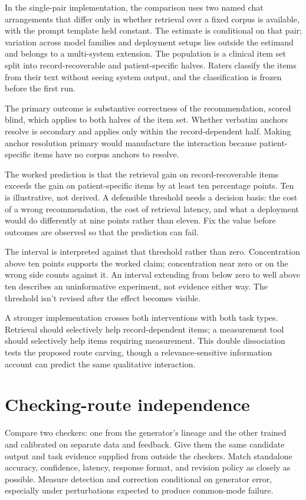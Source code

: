 \documentclass[12pt]{article}
\begin{document}
In the single-pair implementation, the comparison uses two named chat arrangements that
differ only in whether retrieval over a fixed corpus is available, with the prompt template
held constant. The estimate is conditional on that pair; variation across model families
and deployment setups lies outside the estimand and belongs to a multi-system extension.
The population is a clinical item set split into record-recoverable and patient-specific
halves. Raters classify the items from their text without seeing system output, and the
classification is frozen before the first run.

The primary outcome is substantive correctness of the recommendation, scored blind, which
applies to both halves of the item set. Whether verbatim anchors resolve is secondary and
applies only within the record-dependent half. Making anchor resolution primary would
manufacture the interaction because patient-specific items have no corpus anchors to
resolve.

The worked prediction is that the retrieval gain on record-recoverable items exceeds the
gain on patient-specific items by at least ten percentage points. Ten is illustrative, not
derived. A defensible threshold needs a decision basis: the cost of a wrong recommendation,
the cost of retrieval latency, and what a deployment would do differently at nine points
rather than eleven. Fix the value before outcomes are observed so that the prediction can
fail.

The interval is interpreted against that threshold rather than zero. Concentration above
ten points supports the worked claim; concentration near zero or on the wrong side counts
against it. An interval extending from below zero to well above ten describes an
uninformative experiment, not evidence either way. The threshold isn't revised after the
effect becomes visible.

A stronger implementation crosses both interventions with both task types. Retrieval
should selectively help record-dependent items; a measurement tool should selectively help
items requiring measurement. This double dissociation tests the proposed route
carving, though a relevance-sensitive information account can predict the same qualitative
interaction.

\section{Checking-route independence}

Compare two checkers: one from the generator's lineage and the other trained and calibrated
on separate data and feedback. Give them the same candidate output and task evidence
supplied from outside the checkers. Match standalone accuracy, confidence, latency,
response format, and revision policy as closely as possible. Measure detection and
correction conditional on generator error, especially under perturbations expected to
produce common-mode failure.
\end{document}
